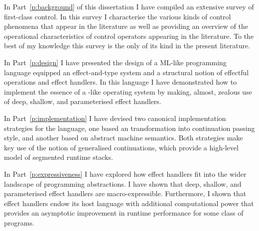 \documentclass[12pt,phd,lfcs,twoside,openright,logo,leftchapter,normalheadings]{infthesis}
\theoremstyle{plain}
\theoremstyle{definition}
\begin{document}
In Part~\ref{p:background} of this dissertation I have compiled an
extensive survey of first-class control. In this survey I characterise
the various kinds of control phenomena that appear in the literature
as well as providing an overview of the operational characteristics of
control operators appearing in the literature. To the best of my
knowledge this survey is the only of its kind in the present
literature.

In Part~\ref{p:design} I have presented the design of a ML-like
programming language equipped an effect-and-type system and a
structural notion of effectful operations and effect handlers. In this
language I have demonstrated how to implement the essence of a
\UNIX{}-like operating system by making, almost, zealous use of deep,
shallow, and parameterised effect handlers.

In Part~\ref{p:implementation} I have devised two canonical
implementation strategies for the language, one based an
transformation into continuation passing style, and another based on
abstract machine semantics. Both strategies make key use of the notion
of generalised continuations, which provide a high-level model of
segmented runtime stacks.

In Part~\ref{p:expressiveness} I have explored how effect handlers fit
into the wider landscape of programming abstractions. I have shown
that deep, shallow, and parameterised effect handlers are
macro-expressible. Furthermore, I shown that effect handlers endow its
host language with additional computational power that provides an
asymptotic improvement in runtime performance for some class of
programs.
\end{document}
